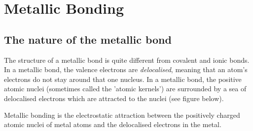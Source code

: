   \label{m38684**end}
         \section{Metallic Bonding}
    \nopagebreak
      \label{m38694*uid77}
            \subsection*{The nature of the metallic bond}
            \nopagebreak
        \label{m38694*id142901}The structure of a metallic bond is quite different from covalent and ionic bonds. In a metallic bond, the valence electrons are \textsl{delocalised}, meaning that an atom's electrons do not stay around that one nucleus. In a metallic bond, the positive atomic nuclei (sometimes called the 'atomic kernels') are surrounded by a sea of delocalised electrons which are attracted to the nuclei (see figure below).\par 
{}
\label{m38694*fhsst!!!underscore!!!id582}
 { \label{m38694*meaningfhsst!!!underscore!!!id582}
Metallic bonding is the electrostatic attraction between the positively charged atomic nuclei of metal atoms and the delocalised electrons in the metal.}
